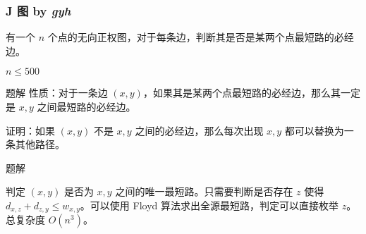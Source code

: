 \frame
{
  \frametitle{J 图 {by \itshape gyh}}

	有一个 $n$ 个点的无向正权图，对于每条边，判断其是否是某两个点最短路的必经边。

	$n\leq 500$

}

\begin{frame}{题解}
	性质：对于一条边 $(x,y)$，如果其是某两个点最短路的必经边，那么其一定是 $x,y$ 之间最短路的必经边。

	证明：如果 $(x,y)$ 不是 $x,y$ 之间的必经边，那么每次出现 $x,y$ 都可以替换为一条其他路径。

\end{frame}

\begin{frame}{题解}

	判定 $(x,y)$ 是否为 $x,y$ 之间的唯一最短路。只需要判断是否存在 $z$ 使得 $d_{x,z}+d_{z,y}\leq w_{x,y}$。可以使用 Floyd 算法求出全源最短路，判定可以直接枚举 $z$。总复杂度 $O(n^3)$。

\end{frame}

